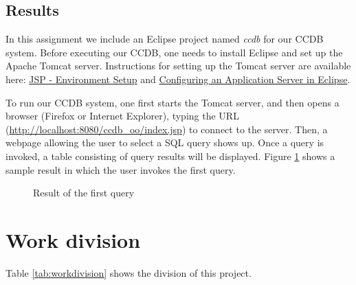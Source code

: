 \documentclass[11pt]{article}
\begin{document}
\subsection{Results}
\par
In this assignment we include an Eclipse project named \textit{ccdb} for our CCDB system. Before executing our CCDB, one needs to install Eclipse and set up the Apache Tomcat server. Instructions for setting up the Tomcat server are available here: \href{http://www.tutorialspoint.com/jsp/jsp_environment_setup.htm}{JSP - Environment Setup} and \href{http://www.eclipse.org/webtools/community/education/web/t320/Configuring_an_Application_Server_in_Eclipse.pdf}{Configuring an Application Server in Eclipse}.

\par
To run our CCDB system, one first starts the Tomcat server, and then opens a browser (Firefox or Internet Explorer), typing the URL (\url{http://localhost:8080/ccdb_oo/index.jsp}) to connect to the server. Then, a webpage allowing the user to select a SQL query shows up. Once a query is invoked, a table consisting of query results will be displayed. Figure \ref{fig:resultccdb} shows a sample result in which the user invokes the first query.

\begin{figure}[!htp]
\centering
{}
\caption{Result of the first query}
\label{fig:resultccdb}
\end{figure}

\section{Work division}
Table \ref{tab:workdivision} shows the division of this project.
\end{document}

